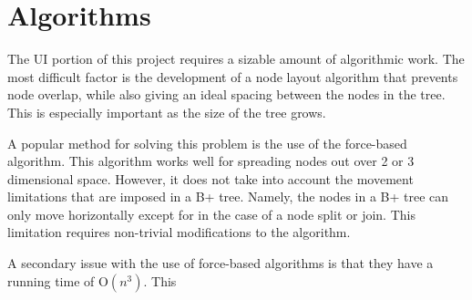\section{Algorithms}



The UI portion of this project requires a sizable amount of
algorithmic work. The most difficult factor is the development of a
node layout algorithm that prevents node overlap, while also giving an
ideal spacing between the nodes in the tree. This is especially
important as the size of the tree grows.

A popular method for solving this problem is the use of the
force-based algorithm. This algorithm works well for spreading nodes
out over 2 or 3 dimensional space. However, it does not take into
account the movement limitations that are imposed in a B+
tree. Namely, the nodes in a B+ tree can only move horizontally except
for in the case of a node split or join. This limitation requires
non-trivial modifications to the algorithm.

A secondary issue with the use of force-based algorithms is that they
have a running time of O$(n^3)$. This 


